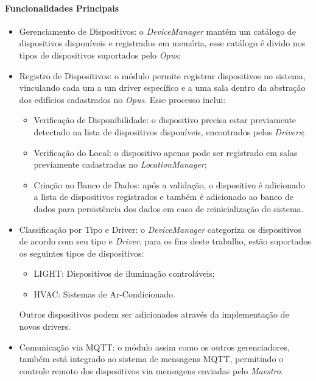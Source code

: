 \paragraph{Funcionalidades Principais}
\begin{itemize}
    \item Gerenciamento de Dispositivos: o \emph{DeviceManager} mantém um catálogo de dispositivos disponíveis e registrados em memória,
        esse catálogo é divido nos tipos de dispositivos suportados pelo \emph{Opus};
    \item Registro de Dispositivos: o módulo permite registrar dispositivos no sistema,
        vinculando cada um a um driver específico e a uma sala dentro da abstração dos edifícios cadastrados no \emph{Opus}. Esse processo inclui:
    \begin{itemize}
        \item Verificação de Disponibilidade: o dispositivo precisa estar previamente detectado na lista de dispositivos disponíveis, encontrados
            pelos \emph{Drivers};
        \item Verificação do Local: o dispositivo apenas pode ser registrado em salas previamente cadastradas
            no \emph{LocationManager};
        \item Criação no Banco de Dados: após a validação, o dispositivo é adicionado a lista de dispositivos registrados e também é
            adicionado ao banco de dados para persistência dos dados em caso de reinicialização do sistema.
    \end{itemize}
    \item Classificação por Tipo e Driver: o \emph{DeviceManager} categoriza os dispositivos de acordo com seu tipo e \emph{Driver}, para
        os fins deste trabalho, estão suportados os seguintes tipos de dispositivos:
    \begin{itemize}
        \item LIGHT: Dispositivos de iluminação controláveis;
        \item HVAC: Sistemas de Ar-Condicionado.
    \end{itemize}
        Outros dispositivos podem ser adicionados através da implementação de novos drivers.
    \item Comunicação via MQTT: o módulo assim como os outros gerenciadores, também está integrado ao sistema de mensagens MQTT,
        permitindo o controle remoto dos dispositivos via mensagens enviadas pelo \emph{Maestro}.
\end{itemize}